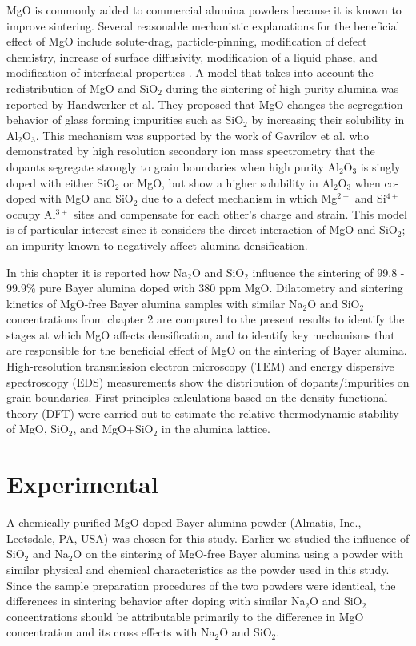 MgO is commonly added to commercial alumina powders because it is known to improve sintering. Several reasonable mechanistic explanations for the beneficial effect of MgO include solute-drag, particle-pinning, modification of defect chemistry, increase of surface diffusivity, modification of a liquid phase, and modification of interfacial properties \cite{Bae1994}. A model that takes into account the redistribution of MgO and SiO$_{2}$ during the sintering of high purity alumina was reported by Handwerker et al. \cite{Handwerker1989} They proposed that MgO changes the segregation behavior of glass forming impurities such as SiO$_{2}$ by increasing their solubility in Al$_{2}$O$_{3}$. This mechanism was supported by the work of Gavrilov et al. \cite{Gavrilov1999} who demonstrated by high resolution secondary ion mass spectrometry that the dopants segregate strongly to grain boundaries when high purity Al$_{2}$O$_{3}$ is singly doped with either SiO$_{2}$ or MgO, but show a higher solubility in Al$_{2}$O$_{3}$ when co-doped with MgO and SiO$_{2}$ due to a defect mechanism in which Mg$^{2+}$ and Si$^{4+}$ occupy Al$^{3+}$ sites and compensate for each other's charge and strain. This model is of particular interest since it considers the direct interaction of MgO and SiO$_{2}$; an impurity known to negatively affect alumina densification. 

In this chapter it is reported how Na$_{2}$O and SiO$_{2}$ influence the sintering of 99.8 - 99.9\% pure Bayer alumina doped with 380 ppm MgO. Dilatometry and sintering kinetics of MgO-free Bayer alumina samples with similar Na$_{2}$O and SiO$_{2}$ concentrations from chapter 2 are compared to the present results to identify the stages at which MgO affects densification, and to identify key mechanisms that are responsible for the beneficial effect of MgO on the sintering of Bayer alumina. High-resolution transmission electron microscopy (TEM) and energy dispersive spectroscopy (EDS) measurements show the distribution of dopants/impurities on grain boundaries. First-principles calculations based on the density functional theory (DFT) were carried out to estimate the relative thermodynamic stability of MgO, SiO$_{2}$, and MgO+SiO$_{2}$ in the alumina lattice.


\section{Experimental}

A chemically purified MgO-doped Bayer alumina powder (Almatis, Inc., Leetsdale, PA, USA) was chosen for this study. Earlier we studied the influence of SiO$_{2}$ and Na$_{2}$O on the sintering of MgO-free Bayer alumina using a powder with similar physical and chemical characteristics as the powder used in this study. Since the sample preparation procedures of the two powders were identical, the differences in sintering behavior after doping with similar Na$_{2}$O and SiO$_{2}$ concentrations should be attributable primarily to the difference in MgO concentration and its cross effects with Na$_{2}$O and SiO$_{2}$. 

